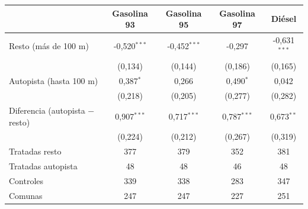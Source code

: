\begin{tabular}{lcccc}
\toprule
 & Gasolina 93 & Gasolina 95 & Gasolina 97 & Diésel \\
\midrule
Resto (más de 100 m) & -0{,}520$^{***}$ & -0{,}452$^{***}$ & -0{,}297 & -0{,}631$^{***}$ \\
 & (0{,}134) & (0{,}144) & (0{,}186) & (0{,}165) \\
Autopista (hasta 100 m) & 0{,}387$^{*}$ & 0{,}266 & 0{,}490$^{*}$ & 0{,}042 \\
 & (0{,}218) & (0{,}205) & (0{,}277) & (0{,}282) \\
Diferencia (autopista $-$ resto) & 0{,}907$^{***}$ & 0{,}717$^{***}$ & 0{,}787$^{***}$ & 0{,}673$^{**}$ \\
 & (0{,}224) & (0{,}212) & (0{,}267) & (0{,}319) \\
\midrule
Tratadas resto & 377 & 379 & 352 & 381 \\
Tratadas autopista & 48 & 48 & 46 & 48 \\
Controles & 339 & 338 & 283 & 347 \\
Comunas & 247 & 247 & 227 & 251 \\
\bottomrule
\end{tabular}
